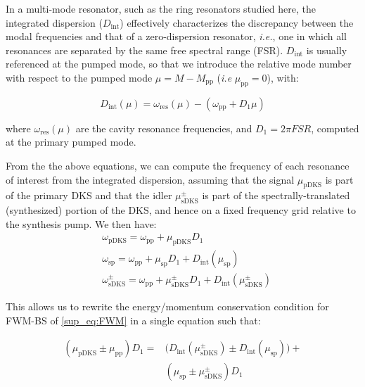 \documentclass[reprint,superscriptaddress, amsmath,amssymb,pra, aps,floatfix,longbibliography]{revtex4-1}
\begin{document}
In a multi-mode resonator, such as the ring resonators studied here, the integrated dispersion ($D_\mathrm{int}$) effectively characterizes the discrepancy between the modal frequencies and that of a zero-dispersion resonator, \textit{i.e.}, one in which all resonances are separated by the same free spectral range (FSR). $D_\mathrm{int}$ is usually referenced at the pumped mode, so that we introduce the relative mode number with respect to the pumped mode $\mu = M - M_\mathrm{pp}$ (\textit{i.e} $\mu_\mathrm{pp} = 0$), with:

\begin{equation}
 \label{sup_eq:Dint}
 D_\mathrm{int}(\mu) = \omega_\mathrm{res}(\mu) -  \left(\omega_\mathrm{pp} + D_1 \mu \right)
\end{equation}

\noindent where $\omega_\mathrm{res}(\mu)$ are the cavity resonance frequencies, and $D_1=2\pi FSR$, computed at the primary pumped mode.

From the the above equations, we can compute the frequency of each resonance of interest from the integrated dispersion, assuming that the signal $\mu_\mathrm{pDKS}$ is part of the primary DKS and that the idler $\mu_\mathrm{sDKS}^{\pm}$ is part of the spectrally-translated (synthesized) portion of the DKS, and hence on a fixed frequency grid relative to the synthesis pump.  We then have:
\begin{align}
  & \omega_\mathrm{pDKS} = \omega_\mathrm{pp} + \mu_\mathrm{pDKS} D_1                 \nonumber\\
  & \omega_\mathrm{sp} = \omega_\mathrm{pp} + \mu_\mathrm{sp} D_1  + D_\mathrm{int}(\mu_\mathrm{sp} )            \\
  & \omega _\mathrm{sDKS}^{\pm} = \omega_\mathrm{pp} + \mu_\mathrm{sDKS}^{\pm} D_1 + D_\mathrm{int}(\mu _\mathrm{sDKS}^{\pm}) \nonumber
\end{align}

This allows us to rewrite the energy/momentum conservation condition for FWM-BS of \cref{sup_eq:FWM} in a single equation such that:

\begin{align}
    \label{sup-eq:dint-fwm-general}
    \left(\mu_\mathrm{pDKS} \pm \mu_\mathrm{pp} \right )D_1 =
    & \Big( D_\mathrm{int}(\mu_\mathrm{sDKS}^{\pm}) \pm D_\mathrm{int}(\mu_\mathrm{sp}) \Big) + \nonumber \\ & \left(\mu_\mathrm{sp} \pm \mu_\mathrm{sDKS}^{\pm} \right )D_1
\end{align}
\end{document}
